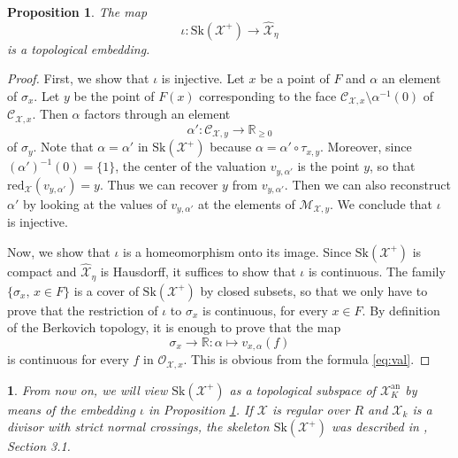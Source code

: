 \documentclass{amsart}%
\numberwithin{equation}{subsection}
\theoremstyle{plain2}
\newtheorem{prop}[equation]{Proposition}
\theoremstyle{definition2}
\theoremstyle{stepstyle}
\theoremstyle{point}
\theoremstyle{subpoint}
\newtheorem{subpoint}[equation]{}%
\newcommand{\spa}[1]{\begin{subpoint}#1\end{subpoint}}           %
\newcommand{\R}{\ensuremath{\mathbb{R}}}
\newcommand{\cX}{\ensuremath{\mathscr{X}}}
\renewcommand{\R}{\ensuremath{\mathbb{R}}}
\newcommand{\redu}{\mathrm{red}}
\newcommand{\an}{\mathrm{an}}
\newcommand{\Sk}{\mathrm{Sk}}
\begin{document}
\begin{prop}\label{prop-embed}
The map $$\iota:\Sk(\cX^+)\to \widehat{\cX}_\eta$$  is a
topological embedding.
\end{prop}
\begin{proof}
First, we show that $\iota$ is injective. Let $x$ be a point of $F$ and $\alpha$ an element of $\sigma_x$. Let $y$ be the point of $F(x)$ corresponding to the face $\mathcal{C}_{\cX,x}\setminus
\alpha^{-1}(0)$ of $\mathcal{C}_{\cX,x}$. Then $\alpha$ factors through an element
$$\alpha':\mathcal{C}_{\cX,y}\to \R_{\geq 0}$$ of $\sigma_y$.  Note that $\alpha=\alpha'$ in $\Sk(\cX^+)$ because $\alpha=\alpha'\circ \tau_{x,y}$.
Moreover, since $(\alpha')^{-1}(0)=\{1\}$, the center of the valuation $v_{y,\alpha'}$ is the point $y$, so that
$\redu_{\cX}(v_{y,\alpha'})=y$. Thus we can recover $y$ from
$v_{y,\alpha'}$. Then we can also reconstruct $\alpha'$ by looking at the values of $v_{y,\alpha'}$ at the elements of $\mathcal{M}_{\cX,y}$. We conclude that $\iota$ is injective.

Now, we show that $\iota$ is a homeomorphism onto its image. Since $\Sk(\cX^+)$ is compact and $\widehat{\cX}_\eta$ is Hausdorff, it suffices to show that $\iota$ is continuous. The family $\{\sigma_x,\,x\in F\}$ is a cover of $\Sk(\cX^+)$ by closed subsets, so that we only have to prove that the restriction of $\iota$ to $\sigma_x$ is continuous, for every $x\in F$. By definition of the Berkovich topology, it is enough to prove that the map $$\sigma_x\to \R:\alpha\mapsto v_{x,\alpha}(f)$$ is continuous for every $f$ in $\mathcal{O}_{\cX,x}$. This is obvious from the formula \eqref{eq:val}.
\end{proof}

\spa{From now on, we will view $\Sk(\cX^+)$ as a topological subspace of $\cX_K^{\an}$ by means of the embedding $\iota$ in Proposition \ref{prop-embed}. If $\cX$ is regular over $R$ and $\cX_k$ is a divisor with strict normal crossings, the skeleton $\Sk(\cX^+)$ was described in \cite{MustataNicaise}, Section 3.1.}
\end{document}

